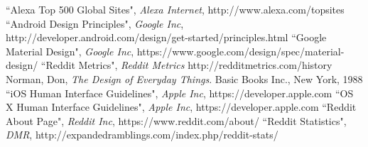 \documentclass{article}
\begin{document}
\clearpage

\begin{thebibliography}{100}

 ``Alexa Top 500 Global Sites", \emph{Alexa Internet}, http://www.alexa.com/topsites
 ``Android Design Principles", \emph{Google Inc}, http://developer.android.com/design/get-started/principles.html
 ``Google Material Design", \emph{Google Inc}, https://www.google.com/design/spec/material-design/
 ``Reddit Metrics", \emph{Reddit Metrics} http://redditmetrics.com/history
 Norman, Don, \emph{The Design of Everyday Things}. Basic Books Inc., New York, 1988
 ``iOS Human Interface Guidelines", \emph{Apple Inc}, https://developer.apple.com
 ``OS X Human Interface Guidelines", \emph{Apple Inc}, https://developer.apple.com
 ``Reddit About Page", \emph{Reddit Inc}, https://www.reddit.com/about/
 ``Reddit Statistics", \emph{DMR}, http://expandedramblings.com/index.php/reddit-stats/

\end{thebibliography}
\end{document}
